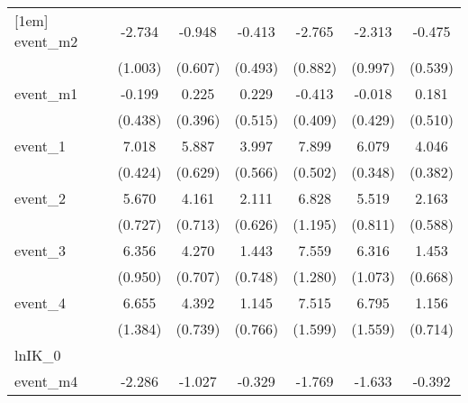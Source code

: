 {\begin{tabular}{l*{6}{c}}
[1em]
event\_m2    &      -2.734\sym{**} &      -0.948         &      -0.413         &      -2.765\sym{**} &      -2.313\sym{*}  &      -0.475         \\
            &     (1.003)         &     (0.607)         &     (0.493)         &     (0.882)         &     (0.997)         &     (0.539)         \\
[1em]
event\_m1    &      -0.199         &       0.225         &       0.229         &      -0.413         &      -0.018         &       0.181         \\
            &     (0.438)         &     (0.396)         &     (0.515)         &     (0.409)         &     (0.429)         &     (0.510)         \\
[1em]
event\_1     &       7.018\sym{***}&       5.887\sym{***}&       3.997\sym{***}&       7.899\sym{***}&       6.079\sym{***}&       4.046\sym{***}\\
            &     (0.424)         &     (0.629)         &     (0.566)         &     (0.502)         &     (0.348)         &     (0.382)         \\
[1em]
event\_2     &       5.670\sym{***}&       4.161\sym{***}&       2.111\sym{***}&       6.828\sym{***}&       5.519\sym{***}&       2.163\sym{***}\\
            &     (0.727)         &     (0.713)         &     (0.626)         &     (1.195)         &     (0.811)         &     (0.588)         \\
[1em]
event\_3     &       6.356\sym{***}&       4.270\sym{***}&       1.443         &       7.559\sym{***}&       6.316\sym{***}&       1.453\sym{*}  \\
            &     (0.950)         &     (0.707)         &     (0.748)         &     (1.280)         &     (1.073)         &     (0.668)         \\
[1em]
event\_4     &       6.655\sym{***}&       4.392\sym{***}&       1.145         &       7.515\sym{***}&       6.795\sym{***}&       1.156         \\
            &     (1.384)         &     (0.739)         &     (0.766)         &     (1.599)         &     (1.559)         &     (0.714)         \\
\hline
lnIK\_0      &                     &                     &                     &                     &                     &                     \\
event\_m4    &      -2.286\sym{**} &      -1.027         &      -0.329         &      -1.769\sym{*}  &      -1.633\sym{**} &      -0.392         \\

\end{tabular}}
